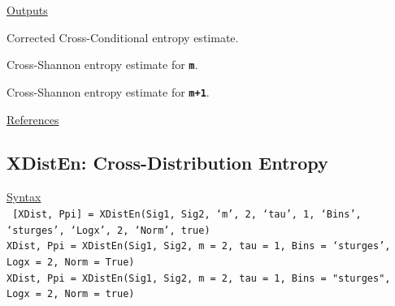 \documentclass[12pt, a4paper, titlepage, openany]{book}
\begin{document}
\noindent \ul{Outputs}
\begin{description}[labelsep=1cm, labelwidth=2cm, nosep, style=multiline,leftmargin=3cm]\footnotesize
\item[\texttt{XCond}]		Corrected Cross-Conditional entropy estimate.
\item[\texttt{SEw}]		Cross-Shannon entropy estimate for \texttt{\textbf{m}}.
\item[\texttt{SEz}]		Cross-Shannon entropy estimate for \texttt{\textbf{m+1}}.
\end{description}

\noindent \ul{References}\hspace{1cm}
\cite{Cond1}



\newpage
\subsection{\normalsize XDistEn: \hspace{15mm} Cross-Distribution Entropy}
\noindent\ul{Syntax} \vspace{6mm} \\ \noindent \texttt{\footnotesize
[XDist, Ppi] = XDistEn(Sig1, Sig2, ‘m’, 2, ‘tau’, 1, ‘Bins’, ‘sturges’, ‘Logx’, 2, ‘Norm’, true)\\
XDist, Ppi  = XDistEn(Sig1, Sig2, m = 2, tau = 1, Bins = ‘sturges’, Logx = 2, Norm = True)\\ 
XDist, Ppi  = XDistEn(Sig1, Sig2, m = 2, tau = 1, Bins = "sturges", Logx = 2, Norm = true)}
\end{document}
